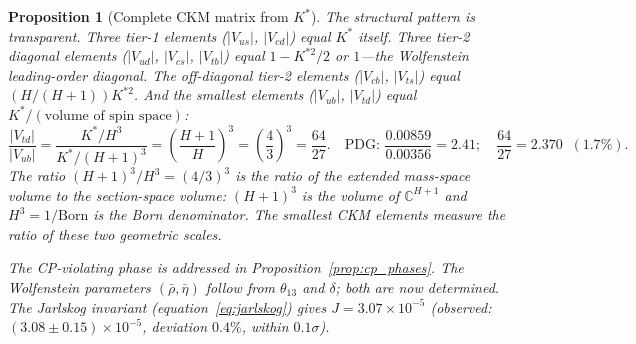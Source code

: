 \documentclass[11pt,a4paper]{article}
\newtheorem{proposition}[theorem]{Proposition}
\theoremstyle{definition}
\theoremstyle{remark}
\newcommand{\C}{\mathbb{C}}
\begin{document}
\begin{proposition}[Complete CKM matrix from $K^*$]
The structural pattern is transparent. Three tier-1 elements ($|V_{us}|$, $|V_{cd}|$) equal $K^*$ itself. Three tier-2 diagonal elements ($|V_{ud}|$, $|V_{cs}|$, $|V_{tb}|$) equal $1-K^{*2}/2$ or $1$---the Wolfenstein leading-order diagonal. The off-diagonal tier-2 elements ($|V_{cb}|$, $|V_{ts}|$) equal $(H/(H+1))K^{*2}$. And the smallest elements ($|V_{ub}|$, $|V_{td}|$) equal $K^*/(\text{volume of spin space})$:
\begin{equation}\label{eq:Vub_Vtd_ratio}
\frac{|V_{td}|}{|V_{ub}|} = \frac{K^*/H^3}{K^*/(H+1)^3} = \left(\frac{H+1}{H}\right)^3 = \left(\frac{4}{3}\right)^3 = \frac{64}{27}.\quad\text{PDG: }\frac{0.00859}{0.00356}=2.41;\quad\frac{64}{27}=2.370\;\;(1.7\%).
\end{equation}
The ratio $(H+1)^3/H^3 = (4/3)^3$ is the ratio of the extended mass-space volume to the section-space volume: $(H+1)^3$ is the volume of $\C^{H+1}$ and $H^3 = 1/\mathrm{Born}$ is the Born denominator. The smallest CKM elements measure the ratio of these two geometric scales.

The CP-violating phase is addressed in Proposition~\ref{prop:cp_phases}. The Wolfenstein parameters $(\bar\rho,\bar\eta)$ follow from $\theta_{13}$ and $\delta$; both are now determined. The Jarlskog invariant (equation~\ref{eq:jarlskog}) gives $J=3.07\times 10^{-5}$ (observed: $(3.08\pm 0.15)\times 10^{-5}$, deviation $0.4\%$, within $0.1\sigma$).
\end{proposition}
\end{document}
